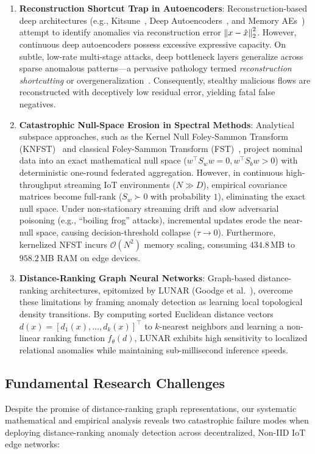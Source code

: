 \begin{enumerate}
    \item \textbf{Reconstruction Shortcut Trap in Autoencoders}: Reconstruction-based deep architectures (e.g., Kitsune~\cite{mirsky2018kitsune}, Deep Autoencoders~\cite{sakurada2014anomaly}, and Memory AEs~\cite{gong2019memorizing}) attempt to identify anomalies via reconstruction error $\left\lVert x - \hat{x}\right\rVert_2^2$. However, continuous deep autoencoders possess excessive expressive capacity. On subtle, low-rate multi-stage attacks, deep bottleneck layers generalize across sparse anomalous patterns---a pervasive pathology termed \emph{reconstruction shortcutting} or overgeneralization~\cite{gong2019memorizing}. Consequently, stealthy malicious flows are reconstructed with deceptively low residual error, yielding fatal false negatives.
    \item \textbf{Catastrophic Null-Space Erosion in Spectral Methods}: Analytical subspace approaches, such as the Kernel Null Foley-Sammon Transform (KNFST)~\cite{bodesheim2013kernel} and classical Foley-Sammon Transform (FST)~\cite{foley1975optimal}, project nominal data into an exact mathematical null space ($w^\top S_w w = 0, w^\top S_b w > 0$) with deterministic one-round federated aggregation. However, in continuous high-throughput streaming IoT environments ($N \gg D$), empirical covariance matrices become full-rank ($S_w \succ 0$ with probability $1$), eliminating the exact null space. Under non-stationary streaming drift and slow adversarial poisoning (e.g., ``boiling frog'' attacks), incremental updates erode the near-null space, causing decision-threshold collapse ($\tau \to 0$). Furthermore, kernelized NFST incurs $\mathcal{O}(N^2)$ memory scaling, consuming $434.8$\,MB to $958.2$\,MB RAM on edge devices.
    \item \textbf{Distance-Ranking Graph Neural Networks}: Graph-based distance-ranking architectures, epitomized by LUNAR (Goodge et al.~\cite{goodge2022lunar}), overcome these limitations by framing anomaly detection as learning local topological density transitions. By computing sorted Euclidean distance vectors $d(x) = [d_1(x), \dots, d_k(x)]^\top$ to $k$-nearest neighbors and learning a non-linear ranking function $f_\theta(d)$, LUNAR exhibits high sensitivity to localized relational anomalies while maintaining sub-millisecond inference speeds.
\end{enumerate}

\subsection{Fundamental Research Challenges}
Despite the promise of distance-ranking graph representations, our systematic mathematical and empirical analysis reveals two catastrophic failure modes when deploying distance-ranking anomaly detection across decentralized, Non-IID IoT edge networks:

